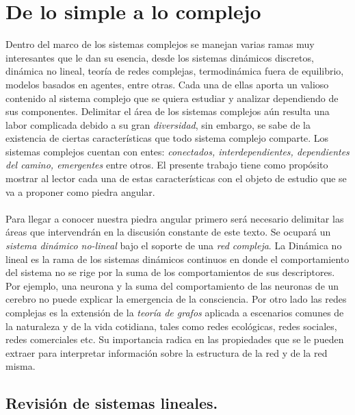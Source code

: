 \chapter{De lo simple a lo complejo}

Dentro del marco de los sistemas complejos se manejan varias ramas muy interesantes que le dan su esencia, desde los sistemas dinámicos discretos, dinámica no lineal, teoría de redes complejas, termodinámica fuera de equilibrio, modelos basados en agentes, entre otras. Cada una de ellas aporta un valioso contenido al sistema complejo que se quiera estudiar y analizar dependiendo de sus componentes. Delimitar el área de los sistemas complejos aún resulta una labor complicada debido a su gran \textit{diversidad}, sin embargo, se sabe de la existencia de ciertas características que todo sistema complejo comparte. Los sistemas complejos cuentan con entes: \textit{conectados, interdependientes, dependientes del camino, emergentes} entre otros. El presente trabajo tiene como propósito mostrar al lector cada una de estas características con el objeto de estudio que se va a proponer como piedra angular.\\
\\
Para llegar a conocer nuestra piedra angular primero será necesario delimitar las áreas que intervendrán en la discusión constante de este texto. Se ocupará un \textit{sistema dinámico no-lineal} bajo el soporte de una \textit{red compleja}. La Dinámica no lineal es la rama de los sistemas dinámicos continuos en donde el comportamiento del sistema no se rige por la suma de los comportamientos de sus descriptores. Por ejemplo, una neurona y la suma del comportamiento de las neuronas de un cerebro no puede explicar la emergencia de la consciencia. Por otro lado las redes complejas es la extensión de la \textit{teoría de grafos} aplicada a escenarios comunes de la naturaleza y de la vida cotidiana, tales como redes ecológicas, redes sociales, redes comerciales etc. Su importancia radica en las propiedades que se le pueden extraer para interpretar información sobre la estructura de la red y de la red misma.

\section{Revisión de sistemas lineales.}

